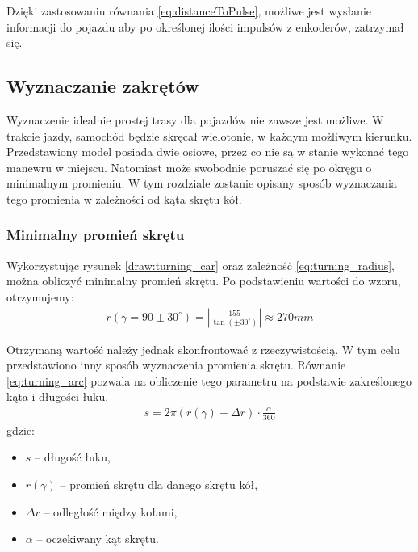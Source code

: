         Dzięki zastosowaniu równania \eqref{eq:distanceToPulse}, możliwe jest wysłanie informacji do pojazdu aby po określonej ilości impulsów z enkoderów, zatrzymał się.


    \subsection{Wyznaczanie zakrętów}
        Wyznaczenie idealnie prostej trasy dla pojazdów nie zawsze jest możliwe.
        W trakcie jazdy, samochód będzie skręcał wielotonie, w każdym możliwym kierunku.
        Przedstawiony model posiada dwie osiowe, przez co nie są w stanie wykonać tego manewru w miejscu.
        Natomiast może swobodnie poruszać się po okręgu o minimalnym promieniu.
        W tym rozdziale zostanie opisany sposób wyznaczania tego promienia w zależności od kąta skrętu kół.

        \subsubsection{Minimalny promień skrętu}
        \label{subsubsec:minamalny_promien}
            Wykorzystując rysunek \ref{draw:turning_car} oraz zależność \eqref{eq:turning_radius}, można obliczyć minimalny promień skrętu.
            Po podstawieniu wartości do wzoru, otrzymujemy:
            \begin{gather}
                r(\gamma = 90 \pm 30^\circ) = \left|\frac{155}{\tan(\pm 30^\circ)}\right| \approx 270mm
            \end{gather}

            Otrzymaną wartość należy jednak skonfrontować z rzeczywistością.
            W tym celu przedstawiono inny sposób wyznaczenia promienia skrętu.
            Równanie \eqref{eq:turning_arc} pozwala na obliczenie tego parametru na podstawie zakreślonego kąta i długości łuku.
            \begin{gather}
                s = 2\pi (r(\gamma) + \Delta r) \cdot \frac{\alpha}{360}
                \label{eq:turning_arc}
            \end{gather}
            gdzie:
            \begin{itemize}
                \item $s$ -- długość łuku,
                \item $r(\gamma)$ -- promień skrętu dla danego skrętu kół,
                \item $\Delta r$ -- odległość między kołami,
                \item $\alpha$ -- oczekiwany kąt skrętu.
            \end{itemize}

